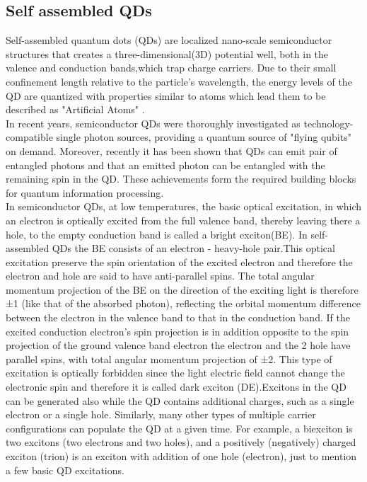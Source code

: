   	\subsection{Self assembled QDs}
	Self-assembled quantum dots (QDs) are localized nano-scale semiconductor structures that creates a three-dimensional(3D) potential well, both in the valence and conduction bands,which trap charge carriers. Due to their small confinement length relative to the particle's wavelength, the energy levels of the QD are quantized with properties similar to atoms which lead them to be described as "Artificial Atoms" \cite{Kastner1993}. \\
In recent years, semiconductor QDs were thoroughly investigated as technology-compatible single photon sources, providing a quantum source of "flying qubits" on demand.\cite{Dekel2000,Michler2000,Michler2000_1,Yuan2002} Moreover, recently it has been shown that QDs can emit pair of entangled photons \cite{Akopian2006,Hafenbrak2007} and that an emitted photon can be entangled with the remaining spin in the QD. \cite{Pelk2012,Schaibley2013,Gao2012} These achievements form the required building blocks for quantum information processing. \cite{DiVincenzo1998,Duan2001}\\
In semiconductor QDs, at low temperatures, the basic optical excitation, in which an electron is optically excited from the full valence band, thereby leaving there a hole, to the empty conduction band is called a bright exciton(BE). In self-assembled QDs the BE consists of an electron - heavy-hole pair.This optical excitation preserve the spin orientation of the excited electron and therefore the electron and hole are said to have anti-parallel spins. The total angular momentum projection of the BE on the direction of the exciting light is therefore ±1 (like that of the absorbed photon), reflecting the orbital momentum difference between the electron in the valence band to that in the conduction band.
If the excited conduction electron's spin projection is in addition opposite to the spin projection of the ground valence band electron the electron and the 2 hole have parallel spins, with total angular momentum projection of ±2. This type of excitation is optically forbidden since the light electric field cannot change the electronic spin and therefore it is called dark exciton (DE).Excitons in the QD can be generated also while the QD contains additional charges, such as a single electron or a single hole. Similarly, many other types of multiple carrier configurations can populate the QD at a given time. For example, a biexciton is two excitons (two electrons and two holes), and a positively (negatively) charged exciton (trion) is an exciton with addition of one hole (electron), just to mention a few basic QD excitations.


